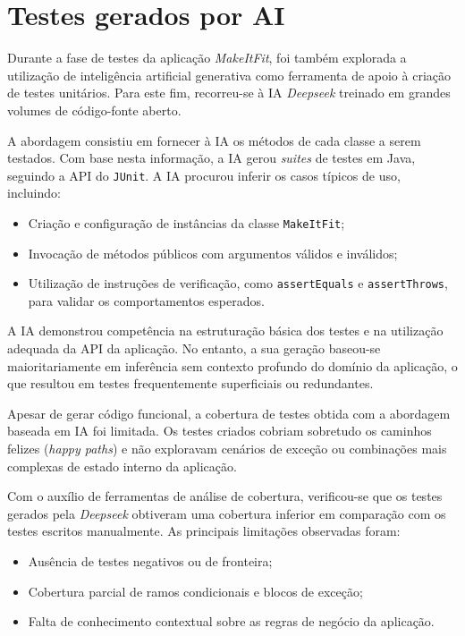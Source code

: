 \documentclass[12pt, a4paper]{article}
\begin{document}
\section{Testes gerados por AI}

Durante a fase de testes da aplicação \textit{MakeItFit}, foi também explorada a utilização de
inteligência artificial generativa como ferramenta de apoio à criação de testes unitários. Para este
fim, recorreu-se à IA \textit{Deepseek} treinado em grandes volumes de código-fonte aberto.

A abordagem consistiu em fornecer à IA os métodos de cada classe a serem testados. Com base nesta
informação, a IA gerou \emph{suites} de testes em Java, seguindo a API do \texttt{JUnit}. A IA
procurou inferir os casos típicos de uso, incluindo:

\begin{itemize}
  \item Criação e configuração de instâncias da classe \texttt{MakeItFit};
  \item Invocação de métodos públicos com argumentos válidos e inválidos;
  \item Utilização de instruções de verificação, como \texttt{assertEquals} e \texttt{assertThrows},
  para validar os comportamentos esperados.
\end{itemize}

A IA demonstrou competência na estruturação básica dos testes e na utilização adequada da API da
aplicação. No entanto, a sua geração baseou-se maioritariamente em inferência sem contexto profundo
do domínio da aplicação, o que resultou em testes frequentemente superficiais ou redundantes.

Apesar de gerar código funcional, a cobertura de testes obtida com a abordagem baseada em IA foi
limitada. Os testes criados cobriam sobretudo os caminhos felizes (\textit{happy paths}) e não
exploravam cenários de exceção ou combinações mais complexas de estado interno da aplicação.

Com o auxílio de ferramentas de análise de cobertura, verificou-se que os testes gerados pela
\textit{Deepseek} obtiveram uma cobertura inferior em comparação com os testes escritos manualmente.
As principais limitações observadas foram:

\begin{itemize}
  \item Ausência de testes negativos ou de fronteira;
  \item Cobertura parcial de ramos condicionais e blocos de exceção;
  \item Falta de conhecimento contextual sobre as regras de negócio da aplicação.
\end{itemize}
\end{document}

